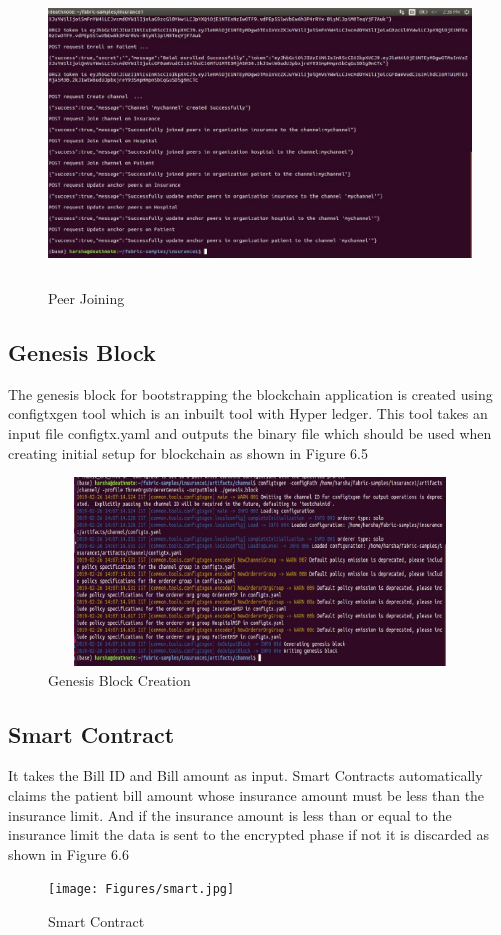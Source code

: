 \begin{figure}[htb!]
  \centering
 \includegraphics[width = 15cm, height = 8cm] {Figures/join.jpg}
  \caption{Peer Joining}
  \label{StH}	
\end{figure}

\subsection{Genesis Block}
The genesis block for bootstrapping the blockchain application is created using configtxgen tool which is an inbuilt tool with Hyper ledger. This tool takes an input file configtx.yaml and outputs the binary file which should be used when creating initial setup for blockchain as shown in Figure 6.5
\begin{figure}[htb!]
  \centering
 \includegraphics[width = 15cm, height = 5cm] {Figures/genesis.jpg}
  \caption{Genesis Block Creation}
  \label{StH}	
\end{figure}

\subsection{Smart Contract}
It takes the Bill ID and Bill amount as input. Smart Contracts automatically claims the patient bill amount whose insurance amount must be less than the insurance limit. And if the insurance amount is less than or equal to the insurance limit the data is sent to the encrypted phase if not it is discarded as shown in Figure 6.6
\begin{figure}[htb!]
  \centering
 \texttt{[image: Figures/smart.jpg]}
  \caption{Smart Contract}
  \label{StH}	
\end{figure}


